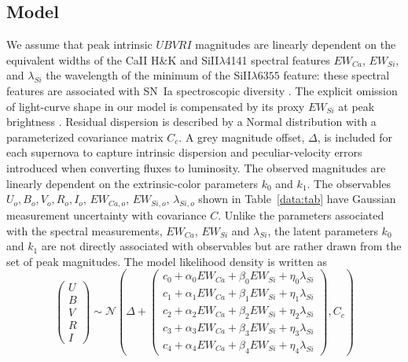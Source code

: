 \documentclass{aastex61}   	%
\begin{document}
\subsection{Model}
We assume 
that  peak intrinsic $UBVRI$ magnitudes are linearly dependent
on the
 equivalent widths of the CaII H\&K and SiII$\lambda$4141 spectral features
$EW_{Ca}$, $EW_{Si}$,
and $\lambda_{Si}$ the wavelength of the minimum of 
the SiII$\lambda6355$ feature:
these spectral features are associated with SN~Ia  spectroscopic diversity  
\citep{2006PASP..118..560B, 2008A&A...492..535A, 2009A&A...500L..17B, 2009PASP..121..238B, 2009ApJ...699L.139W, 2011ApJ...729...55F}.
The explicit omission of light-curve shape in our model is compensated by its proxy
$EW_{Si}$ at peak brightness
\citep{2008A&A...492..535A, 2011A&A...529L...4C}. 
Residual dispersion is described by a Normal distribution with a parameterized covariance matrix
$C_c$.  A grey magnitude offset, $\Delta$, is included for each supernova
to capture intrinsic dispersion and peculiar-velocity errors introduced when converting fluxes to luminosity.
The observed magnitudes are linearly dependent on the
extrinsic-color parameters $k_0$ and $k_1$.  
The observables
$U_o, B_o, V_o, R_o, I_o$, $EW_{Ca,o}$, $EW_{Si,o}$, $\lambda_{Si,o}$
shown in Table~\ref{data:tab} have Gaussian measurement uncertainty with covariance $C$.
Unlike the parameters associated with
the spectral measurements, $EW_{Ca}$, $EW_{Si}$ and $\lambda_{Si}$,  the latent
parameters $k_0$ and $k_1$ are not directly associated
with observables but are rather drawn from the set of peak magnitudes.
The model 
\color{red}
likelihood density
\color{black}
is written as
\begin{equation}
\begin{pmatrix}
U\\B\\V\\R\\I
\end{pmatrix}
\sim \mathcal{N}
\left(
\Delta +
\begin{pmatrix}
c_0+\alpha_0 EW_{Ca} + \beta_0 EW_{Si} + \eta_0 \lambda_{Si} \\
c_1+\alpha_1 EW_{Ca} + \beta_1 EW_{Si} + \eta_1 \lambda_{Si}  \\
c_2+\alpha_2 EW_{Ca} + \beta_2 EW_{Si} + \eta_2 \lambda_{Si} \\
c_3+\alpha_3 EW_{Ca} + \beta_3 EW_{Si} + \eta_3 \lambda_{Si} \\
c_4+\alpha_4 EW_{Ca} + \beta_4 EW_{Si}+ \eta_4 \lambda_{Si}
\end{pmatrix}
,C_{c}
\right)
\label{ewsiv:eqn}
\end{equation}
\end{document}
